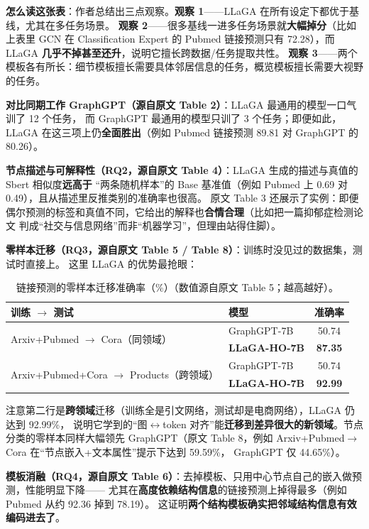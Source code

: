 \documentclass[11pt,UTF8,fontset=fandol]{ctexart}
\begin{document}
\textbf{怎么读这张表}：作者总结出三点观察。\textbf{观察 1}——LLaGA 在所有设定下都优于基线，尤其在多任务场景。
\textbf{观察 2}——很多基线一进多任务场景就\textbf{大幅掉分}（比如上表里 GCN 在 Classification Expert 的
Pubmed 链接预测只有 72.28），而 LLaGA \textbf{几乎不掉甚至还升}，说明它擅长跨数据/任务提取共性。
\textbf{观察 3}——两个模板各有所长：细节模板擅长需要具体邻居信息的任务，概览模板擅长需要大视野的任务。

\textbf{对比同期工作 GraphGPT（源自原文 Table 2）}：LLaGA 最通用的模型一口气训了 12 个任务，
而 GraphGPT 最通用的模型只训了 3 个任务；即便如此，LLaGA 在这三项上仍\textbf{全面胜出}（例如 Pubmed 链接预测
89.81 对 GraphGPT 的 80.26）。

\textbf{节点描述与可解释性（RQ2，源自原文 Table 4）}：LLaGA 生成的描述与真值的 Sbert 相似度\textbf{远高于}
“两条随机样本”的 Base 基准值（例如 Pubmed 上 0.69 对 0.49），且从描述里反推类别的准确率也很高。
原文 Table 3 还展示了实例：即便偶尔预测的标签和真值不同，它给出的解释也\textbf{合情合理}（比如把一篇抑郁症检测论文
判成“社交与信息网络”而非“机器学习”，但理由站得住脚）。

\textbf{零样本迁移（RQ3，源自原文 Table 5 / Table 8）}：训练时没见过的数据集，测试时直接上。
这里 LLaGA 的优势最抢眼：

\begin{table}[H]\centering
\caption{链接预测的零样本迁移准确率（\%）（数值源自原文 Table 5；越高越好）。}
\begin{tabular}{llc}
\toprule
训练 $\to$ 测试 & 模型 & 准确率 \\
\midrule
\multirow{2}{*}{Arxiv+Pubmed $\to$ Cora（同领域）}
 & GraphGPT-7B   & 50.74 \\
 & \textbf{LLaGA-HO-7B} & \textbf{87.35} \\
\midrule
\multirow{2}{*}{Arxiv+Pubmed+Cora $\to$ Products（跨领域）}
 & GraphGPT-7B   & 50.74 \\
 & \textbf{LLaGA-HO-7B} & \textbf{92.99} \\
\bottomrule
\end{tabular}
\end{table}

注意第二行是\textbf{跨领域}迁移（训练全是引文网络，测试却是电商网络），LLaGA 仍达到 92.99\%，
说明它学到的“图$\leftrightarrow$token 对齐”能\textbf{迁移到差异很大的新领域}。节点分类的零样本同样大幅领先
GraphGPT（原文 Table 8，例如 Arxiv+Pubmed$\to$Cora 在“节点嵌入+文本属性”提示下达到 59.59\%，
GraphGPT 仅 44.65\%）。

\textbf{模板消融（RQ4，源自原文 Table 6）}：去掉模板、只用中心节点自己的嵌入做预测，性能明显下降——
尤其在\textbf{高度依赖结构信息}的链接预测上掉得最多（例如 Pubmed 从约 92.36 掉到 78.19）。
这证明\textbf{两个结构模板确实把邻域结构信息有效编码进去了}。
\end{document}
